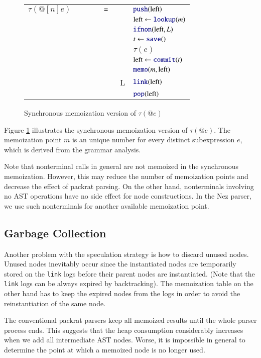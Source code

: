 \documentclass[JIP]{ipsj}
\begin{document}
\begin{figure}[tb]
\begin{tabular}{p{1cm}rrl} 
$\tau(@[n]e)$      &  \verb|      = | & & $\kw{push}(\textrm{left})$  \\
 &  & & $\textrm{left} \leftarrow \kw{lookup}(m)$  \\
 &  & & $\kw{ifnon}(\textrm{left}, L)$  \\
 &  & & $t \leftarrow \kw{save}()$  \\
 & & & $\tau(e)$  \\
 &  & & $\textrm{left} \leftarrow \kw{commit}(t)$  \\
 &  & & $\kw{memo}(m, \textrm{left})$  \\
 &  & L & $\kw{link}(\textrm{left})$  \\
 &  &  & $\kw{pop}(\textrm{left})$  \\ 
\end{tabular}
\caption{Synchronous memoization version of $\tau(@e)$}
\label{fig:memolink}
\end{figure}

Figure \ref{fig:memolink} illustrates the synchronous memoization version of $\tau(@e)$. The memoization point $m$ is an unique number for every distinct subexpression $e$, which is derived from the grammar analysis. 

Note that nonterminal calls in general are not memoized in the synchronous memoization. However, this may reduce the number of memoization points and decrease the effect of packrat parsing. On the other hand, nonterminals involving no AST operations have no side effect for node constructions. In the Nez parser, we use such nonterminals for another available memoization point. 

\subsection{Garbage Collection}

Another problem with the speculation strategy is how to discard unused nodes. 
Unused nodes inevitably occur since the instantiated nodes are temporarily stored on the {\tt link} logs before their parent nodes are instantiated. (Note that the {\tt link} logs can be always expired by backtracking). 
The memoization table on the other hand has to keep the expired nodes from the logs in order to avoid the reinstantiation of the same node.

The conventional packrat parsers keep all memoized results until the whole parser process ends\cite{ICFP02_PackratParsing}. This suggests that the heap consumption considerably increases when we add all intermediate AST nodes. Worse, it is impossible in general to determine the point at which a memoized node is no longer used\cite{PASTE10_Yapp}. 
\end{document}
